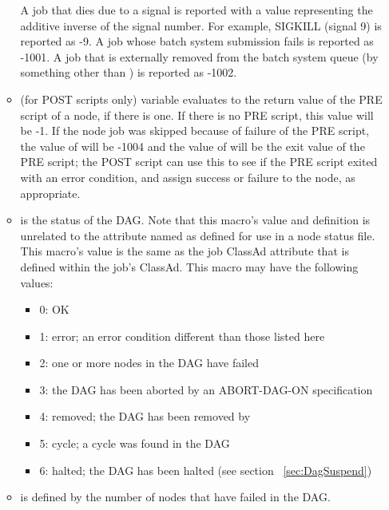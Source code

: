 \begin{itemize}
\begin{itemize}
A job that dies due to a signal is reported with a  value
representing the additive inverse of the signal number.
For example, SIGKILL (signal 9) is reported as -9.
A job whose batch system submission fails is reported as -1001.
A job that is externally removed from the batch system queue
(by something other than ) is reported as -1002.

\item {}
 (for POST scripts only)
variable evaluates to the return value of the PRE script of a node, 
if there is one.
If there is no PRE script, this value will be -1.
If the node job was skipped because of failure of the PRE script,
the value of  will be -1004
and the value of  will be the exit value
of the PRE script;
the POST script can use this to see if the PRE script exited
with an error condition, and assign success or failure to the node, as
appropriate.

\item {} is the status of the DAG.
Note that this macro's value and definition is unrelated to the attribute 
named  as defined for use in a node status file.
This macro's value is the same as the job ClassAd attribute 
that is defined within the  job's ClassAd.
This macro may have the following values:
\begin{itemize}
\item 0: OK
\item 1: error; an error condition different than those listed here
\item 2: one or more nodes in the DAG have failed
\item 3: the DAG has been aborted by an ABORT-DAG-ON specification
\item 4: removed; the DAG has been removed by 
\item 5: cycle; a cycle was found in the DAG
\item 6: halted; the DAG has been halted (see section ~\ref{sec:DagSuspend})
\end{itemize}

\item {} is defined by the number of nodes that have failed in the
DAG.


\end{itemize}
\end{itemize}
